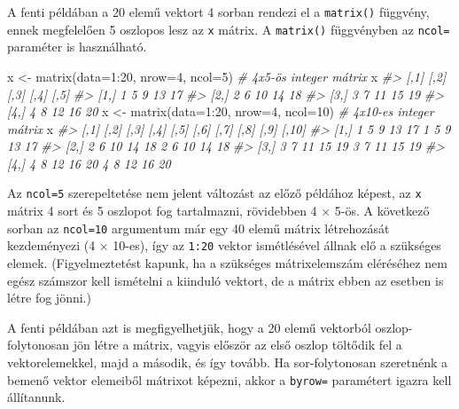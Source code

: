 \documentclass[
]{book}
\newenvironment{Shaded}{\begin{snugshade}}{\end{snugshade}}
\newcommand{\AttributeTok}[1]{\textcolor[rgb]{0.77,0.63,0.00}{#1}}
\newcommand{\CommentTok}[1]{\textcolor[rgb]{0.56,0.35,0.01}{\textit{#1}}}
\newcommand{\DecValTok}[1]{\textcolor[rgb]{0.00,0.00,0.81}{#1}}
\newcommand{\FunctionTok}[1]{\textcolor[rgb]{0.00,0.00,0.00}{#1}}
\newcommand{\NormalTok}[1]{#1}
\newcommand{\OtherTok}[1]{\textcolor[rgb]{0.56,0.35,0.01}{#1}}
\newcommand{\SpecialCharTok}[1]{\textcolor[rgb]{0.00,0.00,0.00}{#1}}
\begin{document}
A fenti példában a 20 elemű vektort 4 sorban rendezi el a \texttt{matrix()} függvény, ennek megfelelően 5 oszlopos lesz az \texttt{x} mátrix. A \texttt{matrix()} függvényben az \texttt{ncol=} paraméter is használható.

\begin{Shaded}
\begin{Highlighting}[]
\NormalTok{x }\OtherTok{\textless{}{-}} \FunctionTok{matrix}\NormalTok{(}\AttributeTok{data=}\DecValTok{1}\SpecialCharTok{:}\DecValTok{20}\NormalTok{, }\AttributeTok{nrow=}\DecValTok{4}\NormalTok{, }\AttributeTok{ncol=}\DecValTok{5}\NormalTok{)        }\CommentTok{\# 4x5{-}ös integer mátrix}
\NormalTok{x}
\CommentTok{\#\textgreater{}      [,1] [,2] [,3] [,4] [,5]}
\CommentTok{\#\textgreater{} [1,]    1    5    9   13   17}
\CommentTok{\#\textgreater{} [2,]    2    6   10   14   18}
\CommentTok{\#\textgreater{} [3,]    3    7   11   15   19}
\CommentTok{\#\textgreater{} [4,]    4    8   12   16   20}
\NormalTok{x }\OtherTok{\textless{}{-}} \FunctionTok{matrix}\NormalTok{(}\AttributeTok{data=}\DecValTok{1}\SpecialCharTok{:}\DecValTok{20}\NormalTok{, }\AttributeTok{nrow=}\DecValTok{4}\NormalTok{, }\AttributeTok{ncol=}\DecValTok{10}\NormalTok{)       }\CommentTok{\# 4x10{-}es integer mátrix}
\NormalTok{x}
\CommentTok{\#\textgreater{}      [,1] [,2] [,3] [,4] [,5] [,6] [,7] [,8] [,9] [,10]}
\CommentTok{\#\textgreater{} [1,]    1    5    9   13   17    1    5    9   13    17}
\CommentTok{\#\textgreater{} [2,]    2    6   10   14   18    2    6   10   14    18}
\CommentTok{\#\textgreater{} [3,]    3    7   11   15   19    3    7   11   15    19}
\CommentTok{\#\textgreater{} [4,]    4    8   12   16   20    4    8   12   16    20}
\end{Highlighting}
\end{Shaded}

Az \texttt{ncol=5} szerepeltetése nem jelent változást az előző példához képest, az \texttt{x} mátrix 4 sort és 5 oszlopot fog tartalmazni, rövidebben 4 \(\times\) 5-ös. A következő sorban az \texttt{ncol=10} argumentum már egy 40 elemű mátrix létrehozását kezdeményezi (4 \(\times\) 10-es), így az \texttt{1:20} vektor ismétlésével állnak elő a szükséges elemek. (Figyelmeztetést kapunk, ha a szükséges mátrixelemszám eléréséhez nem egész számszor kell ismételni a kiinduló vektort, de a mátrix ebben az esetben is létre fog jönni.)

A fenti példában azt is megfigyelhetjük, hogy a 20 elemű vektorból oszlop-folytonosan jön létre a mátrix, vagyis először az első oszlop töltődik fel a vektorelemekkel, majd a második, és így tovább. Ha sor-folytonosan szeretnénk a bemenő vektor elemeiből mátrixot képezni, akkor a \texttt{byrow=} paramétert igazra kell állítanunk.
\end{document}
